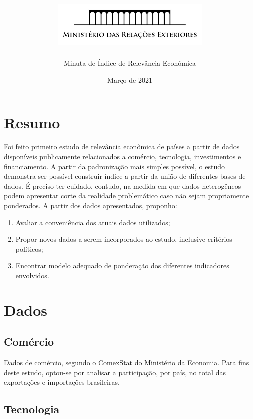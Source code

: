 \documentclass[
]{article}
\title{\includegraphics[width=3in,height=\textheight]{logo-palacio.jpg}}
\author{Minuta de Índice de Relevância Econômica}
\date{Março de 2021}
\providecommand{\tightlist}{%
  \setlength{\itemsep}{0pt}\setlength{\parskip}{0pt}}
\begin{document}
\maketitle

\renewcommand*\contentsname{Índice}
{
\setcounter{tocdepth}{2}
\tableofcontents
}
\newpage

\hypertarget{resumo}{%
\section{Resumo}\label{resumo}}

Foi feito primeiro estudo de relevância econômica de países a partir de
dados disponíveis publicamente relacionados a comércio, tecnologia,
investimentos e financiamento. A partir da padronização mais simples
possível, o estudo demonstra ser possível construir índice a partir da
união de diferentes bases de dados. É preciso ter cuidado, contudo, na
medida em que dados heterogêneos podem apresentar corte da realidade
problemático caso não sejam propriamente ponderados. A partir dos dados
apresentados, proponho:

\begin{enumerate}
\def\labelenumi{\arabic{enumi}.}
\tightlist
\item
  Avaliar a conveniência dos atuais dados utilizados;
\item
  Propor novos dados a serem incorporados ao estudo, inclusive critérios
  políticos;
\item
  Encontrar modelo adequado de ponderação dos diferentes indicadores
  envolvidos.
\end{enumerate}

\hypertarget{dados}{%
\section{Dados}\label{dados}}

\hypertarget{comuxe9rcio}{%
\subsection{Comércio}\label{comuxe9rcio}}

Dados de comércio, segundo o
\href{http://comexstat.mdic.gov.br/}{ComexStat} do Ministério da
Economia. Para fins deste estudo, optou-se por analisar a participação,
por país, no total das exportações e importações brasileiras.

\hypertarget{tecnologia}{%
\subsection{Tecnologia}\label{tecnologia}}
\end{document}
